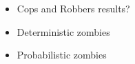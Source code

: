 \begin{itemize}
  \item Cops and Robbers results?
  \item Deterministic zombies
  \item Probabilistic zombies
\end{itemize}
